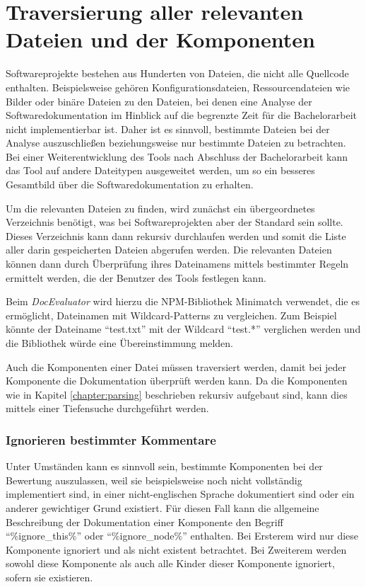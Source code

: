 \section{Traversierung aller relevanten Dateien und der Komponenten}\label{chapter:traversing}
Softwareprojekte bestehen aus Hunderten von Dateien, die nicht alle Quellcode enthalten. Beispielsweise gehören Konfigurationsdateien, Ressourcendateien wie Bilder oder binäre Dateien zu den Dateien, bei denen eine Analyse der Softwaredokumentation im Hinblick auf die begrenzte Zeit für die Bachelorarbeit nicht implementierbar ist. Daher ist es sinnvoll, bestimmte Dateien bei der Analyse auszuschließen beziehungsweise nur bestimmte Dateien zu betrachten. Bei einer Weiterentwicklung des Tools nach Abschluss der Bachelorarbeit kann das Tool auf andere Dateitypen ausgeweitet werden, um so ein besseres Gesamtbild über die Softwaredokumentation zu erhalten.

Um die relevanten Dateien zu finden, wird zunächst ein übergeordnetes Verzeichnis benötigt, was bei Softwareprojekten aber der Standard sein sollte. Dieses Verzeichnis kann dann rekursiv durchlaufen werden und somit die Liste aller darin gespeicherten Dateien abgerufen werden. Die relevanten Dateien können dann durch Überprüfung ihres Dateinamens mittels bestimmter Regeln ermittelt werden, die der Benutzer des Tools festlegen kann.

Beim \textit{DocEvaluator} wird hierzu die NPM-Bibliothek Minimatch \cite{Minimatch} verwendet, die es ermöglicht, Dateinamen mit Wildcard-Patterns zu vergleichen. Zum Beispiel könnte der Dateiname \enquote{test.txt} mit der Wildcard \enquote{test.*} verglichen werden und die Bibliothek würde eine Übereinstimmung melden.

Auch die Komponenten einer Datei müssen traversiert werden, damit bei jeder Komponente die Dokumentation überprüft werden kann. Da die Komponenten wie in Kapitel \ref{chapter:parsing} beschrieben rekursiv aufgebaut sind, kann dies mittels einer Tiefensuche durchgeführt werden.

\subsubsection{Ignorieren bestimmter Kommentare}

Unter Umständen kann es sinnvoll sein, bestimmte Komponenten bei der Bewertung auszulassen, weil sie beispielsweise noch nicht vollständig implementiert sind, in einer nicht-englischen Sprache dokumentiert sind oder ein anderer gewichtiger Grund existiert. Für diesen Fall kann die allgemeine Beschreibung der Dokumentation einer Komponente  den Begriff \enquote{\%ignore\_this\%} oder \enquote{\%ignore\_node\%} enthalten. Bei Ersterem wird nur diese Komponente ignoriert und als nicht existent betrachtet. Bei Zweiterem werden sowohl diese Komponente als auch alle Kinder dieser Komponente ignoriert, sofern sie existieren.




